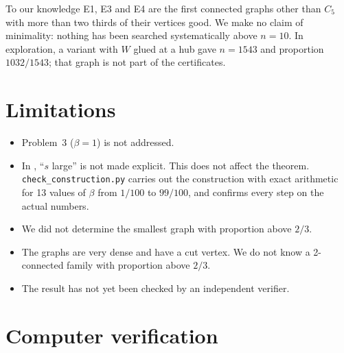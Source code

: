 \documentclass[11pt,a4paper]{report}
\begin{document}
To our knowledge E1, E3 and E4 are the first connected graphs other than \(C_5\) with more than two thirds of their vertices
good. We make no claim of minimality: nothing has been searched systematically above \(n=10\). In exploration, a variant with \(W\)
glued at a hub gave \(n=1543\) and proportion \(1032/1543\); that graph is not part of the certificates.

\section{Limitations}\label{sec:limits}

\begin{itemize}
\item Problem~3 (\(\beta=1\)) is not addressed.
\item In , ``\(s\) large'' is not made explicit. This does not affect the theorem. \texttt{check\_construction.py}
carries out the construction with exact arithmetic for 13 values of \(\beta\) from \(1/100\) to \(99/100\), and confirms every
step on the actual numbers.
\item We did not determine the smallest graph with proportion above \(2/3\).
\item The graphs are very dense and have a cut vertex. We do not know a 2-connected family with proportion above \(2/3\).
\item The result has not yet been checked by an independent verifier.
\end{itemize}

\section{Computer verification}\label{sec:verif}
\end{document}
